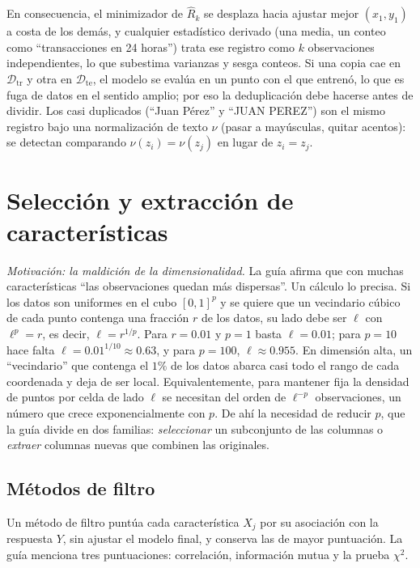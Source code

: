 \documentclass[11pt]{article}
\theoremstyle{definition}
\theoremstyle{remark}
\newcommand{\Dtr}{\mathcal{D}_{\mathrm{tr}}}
\newcommand{\Dte}{\mathcal{D}_{\mathrm{te}}}
\begin{document}
\noindent En consecuencia, el minimizador de $\hat R_k$ se desplaza hacia ajustar mejor $(x_1,y_1)$ a costa de los demás, y cualquier estadístico derivado (una media, un conteo como ``transacciones en 24 horas'') trata ese registro como $k$ observaciones independientes, lo que subestima varianzas y sesga conteos. Si una copia cae en $\Dtr$ y otra en $\Dte$, el modelo se evalúa en un punto con el que entrenó, lo que es fuga de datos en el sentido amplio; por eso la deduplicación debe hacerse antes de dividir. Los casi duplicados (``Juan Pérez'' y ``JUAN PEREZ'') son el mismo registro bajo una normalización de texto $\nu$ (pasar a mayúsculas, quitar acentos): se detectan comparando $\nu(z_i)=\nu(z_j)$ en lugar de $z_i=z_j$.

\section{Selección y extracción de características}\label{sec:seleccion}

\noindent \emph{Motivación: la maldición de la dimensionalidad.} La guía afirma que con muchas características ``las observaciones quedan más dispersas''. Un cálculo lo precisa. Si los datos son uniformes en el cubo $[0,1]^p$ y se quiere que un vecindario cúbico de cada punto contenga una fracción $r$ de los datos, su lado debe ser $\ell$ con $\ell^p=r$, es decir, $\ell=r^{1/p}$. Para $r=0.01$ y $p=1$ basta $\ell=0.01$; para $p=10$ hace falta $\ell=0.01^{1/10}\approx0.63$, y para $p=100$, $\ell\approx0.955$. En dimensión alta, un ``vecindario'' que contenga el $1\%$ de los datos abarca casi todo el rango de cada coordenada y deja de ser local. Equivalentemente, para mantener fija la densidad de puntos por celda de lado $\ell$ se necesitan del orden de $\ell^{-p}$ observaciones, un número que crece exponencialmente con $p$. De ahí la necesidad de reducir $p$, que la guía divide en dos familias: \emph{seleccionar} un subconjunto de las columnas o \emph{extraer} columnas nuevas que combinen las originales.

\subsection{Métodos de filtro}\label{sec:filtros}

\noindent Un método de filtro puntúa cada característica $X_j$ por su asociación con la respuesta $Y$, sin ajustar el modelo final, y conserva las de mayor puntuación. La guía menciona tres puntuaciones: correlación, información mutua y la prueba $\chi^2$.
\end{document}
